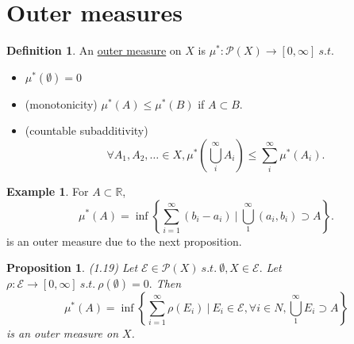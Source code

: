 \documentclass{report}
\newcommand{\R}{\mathbb{R}}
\newcommand{\st}{\ s.t.\ }
\newtheorem{proposition}[theorem]{Proposition}
\theoremstyle{definition}
\newtheorem{definition}[theorem]{Definition}
\newtheorem{example}[theorem]{Example}
\theoremstyle{remark}
\begin{document}
\section{Outer measures}
\begin{definition}
An \underline{outer measure} on $X$ is $\mu^*: \mathcal{P}(X) \to [0, \infty] \st$
\begin{itemize}
\item
	$\mu^*(\emptyset) = 0$
\item(monotonicity)
	$\mu^*(A) \leq \mu^*(B)$ if $A \subset B.$
\item(countable subadditivity)
	\[\forall A_1, A_2, \ldots \in X, \mu^*\left(\bigcup_i^\infty A_i\right) \leq \sum_i^\infty \mu^*(A_i).\]
\end{itemize}
\end{definition}
\begin{example}
	For $A \subset \R$,
	\[\mu^*(A) = \inf\left\{\sum_{i=1}^\infty(b_i - a_i) \ \biggr\rvert\ \bigcup_1^\infty (a_i, b_i) \supset A\right\}.\]
	is an outer measure due to the next proposition.
\end{example}
\begin{proposition}(1.19)
Let $\mathcal{E} \in \mathcal{P}(X) \st \emptyset, X \in \mathcal{E}.$
Let $\rho: \mathcal{E} \to [0, \infty] \st \rho(\emptyset) = 0.$
Then
\[
\mu^*(A) = \inf\left\{\sum_{i=1}^\infty \rho(E_i) \ \biggr\rvert\ E_i \in \mathcal{E}, \forall i \in N, \bigcup_1^\infty E_i \supset A\right\}\]
is an outer measure on $X$.
\end{proposition}
\end{document}
